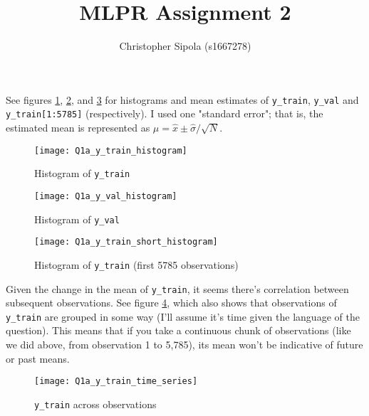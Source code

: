 \documentclass[]{article}
\title{MLPR Assignment 2}
\author{Christopher Sipola (s1667278)}
\begin{document}
\maketitle

\section{}

\subsection{}

See figures \ref{fig:ytrainhist},  \ref{fig:yvalhist}, and \ref{fig:ytrainshorthist} for histograms and mean estimates of \texttt{y\_train}, \texttt{y\_val} and \texttt{y\_train[1:5785]} (respectively). I used one "standard error"; that is, the estimated mean is represented as $\mu = \hat{x} \pm \hat{\sigma} / \sqrt{N}$.

\begin{figure}
	\texttt{[image: Q1a\_y\_train\_histogram]}
	\caption{\label{fig:ytrainhist} Histogram of \texttt{y\_train}}
\end{figure}

\begin{figure}
	\texttt{[image: Q1a\_y\_val\_histogram]}
	\caption{\label{fig:yvalhist} Histogram of \texttt{y\_val}}
\end{figure}

\begin{figure}
	\texttt{[image: Q1a\_y\_train\_short\_histogram]}
	\caption{\label{fig:ytrainshorthist} Histogram of \texttt{y\_train} (first 5785 observations)}
\end{figure}

Given the change in the mean of \texttt{y\_train}, it seems there's correlation between subsequent observations. See figure \ref{fig:ytraintimeseries}, which also shows that observations of \texttt{y\_train} are grouped in some way (I'll assume it's time given the language of the question). This means that if you take a continuous chunk of observations (like we did above, from observation 1 to 5,785), its mean won't be indicative of future or past means.

\begin{figure}
	\texttt{[image: Q1a\_y\_train\_time\_series]}
	\caption{\label{fig:ytraintimeseries} \texttt{y\_train} across observations}
\end{figure}
\end{document}
